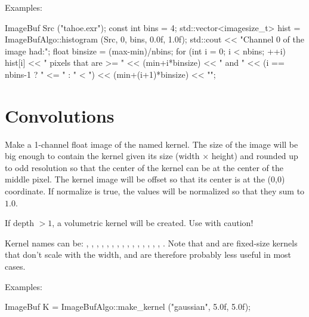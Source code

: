 \smallskip
\noindent Examples:
\begin{code}
    ImageBuf Src ("tahoe.exr");
    const int bins = 4;
    std::vector<imagesize_t> hist =
        ImageBufAlgo::histogram (Src, 0, bins, 0.0f, 1.0f);
    std::cout << "Channel 0 of the image had:\n";
    float binsize = (max-min)/nbins;
    for (int i = 0;  i < nbins;  ++i)
        hist[i] << " pixels that are >= " << (min+i*binsize) << " and "
                << (i == nbins-1 ? " <= " : " < ")
                << (min+(i+1)*binsize) << "\n";
\end{code}
\apiend




\section{Convolutions}
\label{sec:iba:convolutions}

 
Make a 1-channel {\cf float} image of the named kernel.
The size of the image will be big enough to contain the kernel
given its size ({\cf width} $\times$ {\cf height})
and rounded up to odd resolution so
that the center of the kernel can be at the center of the middle
pixel.  The kernel image will be offset so that its center is at the
{\cf (0,0)} coordinate.  If {\cf normalize} is true, the values will be
normalized so that they sum to $1.0$.

If {\cf depth} $> 1$, a volumetric kernel will be created.  Use with
caution!

Kernel names can be: , , ,
, , , ,
, , , , ,
, , , . Note that
 and  are fixed-size kernels that don't
scale with the width, and are therefore probably less useful in most
cases.

\smallskip
\noindent Examples:
\begin{code}
    ImageBuf K = ImageBufAlgo::make_kernel ("gaussian", 5.0f, 5.0f);
\end{code}
\apiend


 

